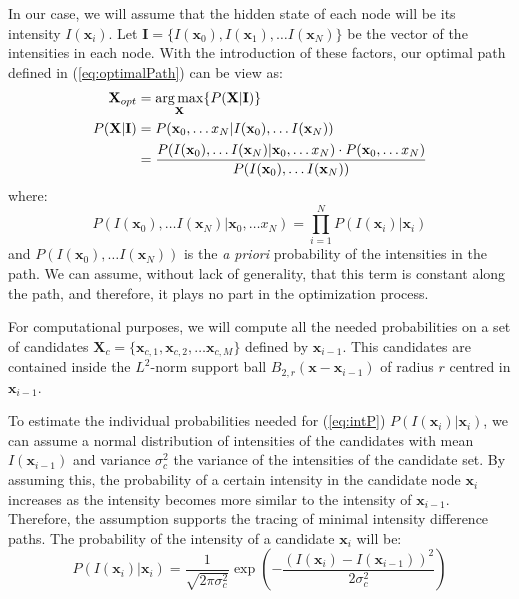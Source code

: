 In our case, we will assume that the hidden state of each node will be its intensity $I(\mathbf{x}_i)$. Let $\mathbf{I} = \{I(\mathbf{x}_0), I(\mathbf{x}_1), \dots I(\mathbf{x}_N)\}$ be the vector of the intensities in each node. With the introduction of these factors, our optimal path defined in (\ref{eq:optimalPath}) can be view as:
\begin{align}
\mathbf{X}_{opt} & = \operatorname*{arg\,max}_\mathbf{X} \{P(\mathbf{X}|\mathbf{I})\}\\
P(\mathbf{X}|\mathbf{I}) & = P(\mathbf{x}_0, \dots x_N| I(\mathbf{x}_0), \dots I(\mathbf{x}_N))\\
& = \frac{P(I(\mathbf{x}_0), \dots I(\mathbf{x}_N)|\mathbf{x}_0, \dots x_N)\cdot P(\mathbf{x}_0, \dots x_N)}{P(I(\mathbf{x}_0), \dots I(\mathbf{x}_N))}\label{eq:final}
\end{align}
where:
\begin{equation}\label{eq:intP}
P(I(\mathbf{x}_0), \dots I(\mathbf{x}_N)|\mathbf{x}_0, \dots x_N)  = \prod_{i=1}^{N} P (I(\mathbf{x}_i)|\mathbf{x}_i)
\end{equation}
and $P(I(\mathbf{x}_0), \dots I(\mathbf{x}_N))$ is the \textit{a priori} probability of the intensities in the path. We can assume, without lack of generality, that this term is constant along the path, and therefore, it plays no part in the optimization process.

For computational purposes, we will compute all the needed probabilities on a set of candidates $\mathbf{X}_c = \{\mathbf{x}_{c,1}, \mathbf{x}_{c,2}, \dots \mathbf{x}_{c,M} \}$ defined by $\mathbf{x}_{i-1}$. This candidates are contained inside the $L^2$-norm support ball $B_{2,r}(\mathbf{x}-\mathbf{x}_{i-1})$ of radius $r$ centred in $\mathbf{x}_{i-1}$.

To estimate the individual probabilities needed for (\ref{eq:intP}) $P (I(\mathbf{x}_i)|\mathbf{x}_i)$, we can assume a normal distribution of intensities of the candidates with mean $I(\mathbf{x}_{i-1})$ and variance $\sigma_c^2$ the variance of the intensities of the candidate set. By assuming this, the probability of a certain intensity in the candidate node $\mathbf{x}_i$ increases as the intensity becomes more similar to the intensity of $\mathbf{x}_{i-1}$. Therefore, the assumption supports the tracing of minimal intensity difference paths. The probability of the intensity of a candidate $\mathbf{x}_i$ will be: 
\begin{equation}\label{eq:intensity}
P(I(\mathbf{x}_i)|\mathbf{x}_i) =\frac{1}{\sqrt{2\pi \sigma_c^2}}\exp\left(-\frac{(I(\mathbf{x}_i)-I(\mathbf{x}_{i-1}))^2}{2\sigma_c^2}\right)
\end{equation}

